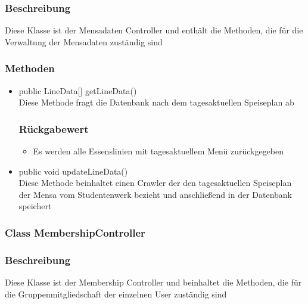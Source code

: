 \documentclass[a4paper]{scrreprt}
\begin{document}
\subsubsection*{Beschreibung}
Diese Klasse ist der Mensadaten Controller und enthält die Methoden, die für die Verwaltung der Mensadaten zuständig sind

\subsubsection*{Methoden}
\begin{addmargin}[25pt]{0pt}
\begin{itemize}

\item public LineData[] getLineData()\\
	Diese Methode fragt die Datenbank nach dem tagesaktuellen Speiseplan ab

	\subsubsection*{Rückgabewert}
	\begin{itemize}
	\item Es werden alle Essenslinien mit tagesaktuellem Menü zurückgegeben
	\end{itemize}
	
\item public void updateLineData()\\
	Diese Methode beinhaltet einen Crawler der den tagesaktuellen Speiseplan der Mensa vom Studentenwerk bezieht und anschließend in der Datenbank speichert
\end{itemize}
\end{addmargin}

\subsubsection{Class MembershipController}
\subsubsection*{Beschreibung}
Diese Klasse ist der Membership Controller und beinhaltet die Methoden, die für die Gruppenmitgliedschaft der einzelnen User zuständig sind
\end{document}
